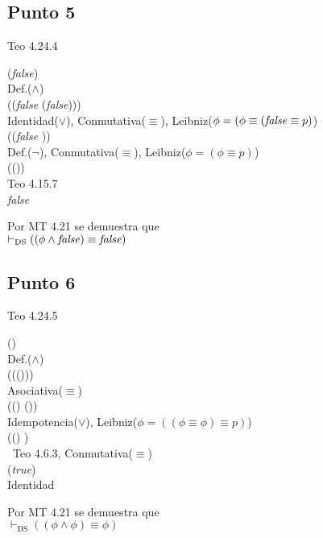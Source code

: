 \documentclass{article}
\begin{document}
\subsection{Punto 5}
\begin{logicenv}{Teo 4.24.4}
    \begin{derivation}
            (\phi \land \textrm{\textit{false}})\\
        Def.($\land$)\\
            (\phi \equiv (\textrm{\textit{false}} \equiv (\phi \lor \textrm{\textit{false}})))\\
        Identidad($\lor$), Conmutativa($\equiv$), Leibniz($\phi = (\phi \equiv (\textrm{\textit{false}} \equiv p)$)\\
            (\phi \equiv (\textrm{\textit{false}} \equiv \phi))\\
        Def.($\neg$), Conmutativa($\equiv$), Leibniz($\phi = (\phi \equiv p)$)\\
            (\phi \equiv (\neg \phi))\\
        Teo 4.15.7\\
            \textrm{\textit{false}}
    \end{derivation}
    Por MT 4.21 se demuestra que\\
    $\vdash_{\text{DS}} ((\phi \land \textrm{\textit{false}}) \equiv \textrm{\textit{false}})$
\end{logicenv}

\subsection{Punto 6}
\begin{logicenv}{Teo 4.24.5}
    \begin{derivation}
            (\phi \land \phi)\\
        Def.($\land$)\\
            (\phi \equiv (\phi \equiv (\phi \lor \phi)))\\
        Asociativa($\equiv$)\\
            ((\phi \equiv \phi) \equiv (\phi \lor \phi))\\
        Idempotencia($\lor$), Leibniz($\phi = ((\phi \equiv \phi) \equiv p)$)\\
            ((\phi \equiv \phi) \equiv \phi)\\\
        Teo 4.6.3, Conmutativa($\equiv$)\\
            (\phi \equiv \textrm{\textit{true}})\\
        Identidad\\
            \phi
    \end{derivation}
    Por MT 4.21 se demuestra que\\
    $\vdash_{\text{DS}} ((\phi \land \phi) \equiv \phi)$
\end{logicenv}
\end{document}
